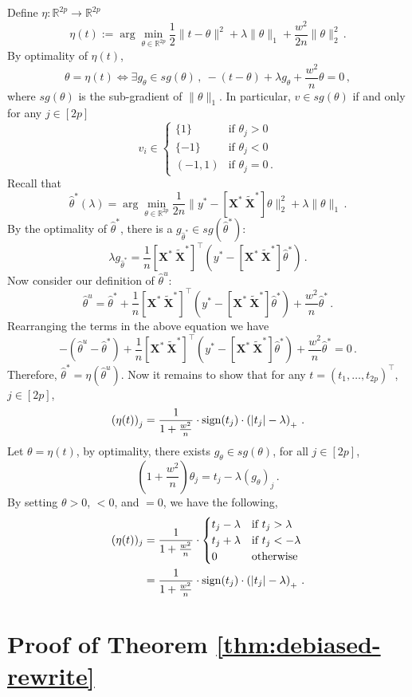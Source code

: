 \documentclass[11pt]{article}
\newcommand{\bX}{\boldsymbol{X}}
\newcommand{\bXT}{\widetilde{\bX} }
\newcommand{\mbR}{\mathbb{R}}
\newcommand{\sign}{{\rm sign}}
\newcommand{\hth}{\widehat{\theta}}
\begin{document}
Define $\eta:\mbR^{2p}\to\mbR^{2p}$
\[
\eta(t) := \arg\min_{\theta\in\mathbb{R}^{2p}}\frac{ 1}{2}\|t-\theta\|^2+\lambda\|\theta\|_1+\frac{w^2}{2n}\|\theta\|_2^2 \,.
\]
By optimality of $\eta  (t)$, 
\[
    \theta = \eta  (t) \iff  \exists g_\theta \in sg(\theta)\,,\ -(t-\theta) + \lambda g_\theta +\frac{w^2}{n}\theta = 0\,,
\]
where $sg(\theta)$ is the sub-gradient of  $\|\theta\|_1$. In particular, $v\in sg(\theta)$ if and only for any $j\in [2p]$
\[
    v_i \in \begin{cases}
        \{1\} & \text{if } \theta_j>0\\
        \{-1\} & \text{if } \theta_j<0\\
        (-1, 1) & \text{if } \theta_j = 0\,.
    \end{cases}
\]
Recall that 
\[
\hth^*(\lambda) = \arg\min_{\theta\in\mbR^{2p}}\frac{1}{2n}\|y^* -[\bX^*\ \bXT^*]\theta  \|_2^2+\lambda\|\theta\|_1\,.
\]
By the optimality of $\hth^*$, there is a $g_{\hth^*} \in sg(\hth^*)$:
\[    
\lambda g_{\hth^*} = \frac{1}{n}[\bX^*\ \bXT^*]^\top (y^*-[\bX^*\ \bXT^*]\hth^*)\,.
\]
Now consider our definition of $\hth^u$:
\[
\hth^u = \hth^* +\frac{1}{ n}[\bX^*\ \bXT^*]^\top (y^*-[\bX^*\ \bXT^*]\hth^*)+\frac{w^2}{ n}\hth^*\,.
\]
Rearranging the terms in the above equation we have
\[
- (\hth^u -  \hth^*)+\frac{1}{n}[\bX^*\ \bXT^*]^\top (y^*-[\bX^*\ \bXT^*]\hth^*)+\frac{w^2}{n}\hth^*=0\,.
\]
Therefore, $\hth^* = \eta  (\hth^u)$. Now it remains to show that for any $t=(t_1,\dotsc,t_{2p})^\top$, $j\in[2p]$,
\[\left(\eta  (t)\right)_j= \frac{1}{1+ \frac{w^2}{ n}}\cdot \sign(t_j)\cdot\left(|t_j|-\lambda\right)_+\,.\]
Let $\theta = \eta  (t)$, by optimality, there exists $g_\theta \in sg(\theta)$, for all $j\in[2p]$, 
\[    
\left(1+\frac{w^2}{  n}\right)\theta_j=t_j-\lambda (g_\theta)_j\,.
\]
By setting $\theta>0$, $<0$, and $=0$, we have the following,
\begin{align*}
     (\eta  (t))_j &= \frac{1}{1+ \frac{w^2}{  n}}\cdot\begin{cases}
        t_j-\lambda & \text{if } t_j>\lambda\\
        t_j+\lambda & \text{if } t_j<-\lambda\\
        0 & \text{otherwise}\\
    \end{cases}\\
    &= \frac{1}{1+ \frac{w^2}{  n}}\cdot \sign(t_j)\cdot\left(|t_j|-\lambda\right)_+\,.
\end{align*}
\section{Proof of Theorem \ref{thm:debiased-rewrite}}\label{pf:debiased-rewrite}
\end{document}
